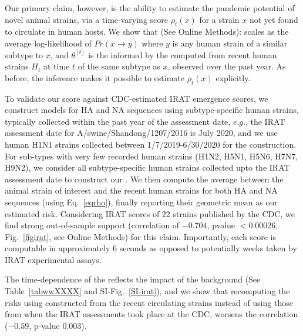 \documentclass[onecolumn, compsoc,10pt]{IEEEtran}
\def\METHODS{Online Methods\xspace}
\begin{document}
Our primary claim, however,  is the ability to estimate the pandemic potential of novel animal strains, via a  time-varying \erisk score $\rho_t(x)$ for a strain $x$ not yet found to circulate in human hosts. We show that (See \METHODS):%
%
scales as the average log-likelihood of $Pr(x \rightarrow y)$ where $y$ is any human strain of a similar subtype to $x$, and  $\theta^{[t]}$ is the \qdist informed by the \enet computed from recent human strains $H_t$ at time $t$ of the same subtype as $x$, observed over the past year. As before, the \enet inference makes it possible to estimate $\rho_t(x)$ explicitly. 

To validate our score against CDC-estimated IRAT emergence scores, we construct \enet models for HA and NA sequences using subtype-specific human strains, typically collected within the past year of the assessment date, $e.g.$,  the IRAT assessment date for A/swine/Shandong/1207/2016 is July 2020, and  we  use human H1N1 strains collected  between 1/7/2019-6/30/2020 for the \enet construction. For sub-types with very few recorded human strains (H1N2, H5N1, H5N6, H7N7, H9N2), we consider all subtype-specific human strains collected upto the IRAT assessment date  to construct our \enet. We then compute the average \qdist between the animal  strain of interest  and the recent human strains for both HA and NA sequences (using Eq.~\eqref{eqrho}),  finally reporting their geometric mean as our estimated risk. Considering IRAT scores of 22 strains published by the CDC, we find strong out-of-sample support  (correlation of $-0.704$, pvalue $< 0.00026$, Fig.~\ref{figirat}, see \METHODS) for this claim. Importantly, each \erisk score  is  computable in approximately $6$ seconds as opposed to potentially weeks taken by IRAT experimental assays.


The time-dependence of the \erisk reflects the impact of the background (See Table~\ref{tabwwXXXX}  and SI-Fig.~\ref{SI-irat}), and
we show that recomputing the risks using  constructed from the recent circulating strains instead of using those from when the IRAT assessments took place at the  CDC,  worsens the correlation ($-0.59$, p-value $0.003$).
\end{document}
